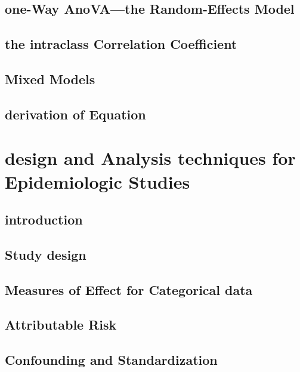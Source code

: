 \documentclass[12pt,]{article}
\theoremstyle{definition}
\theoremstyle{definition}
\theoremstyle{definition}
\theoremstyle{remark}
\begin{document}
\subsection{one-Way AnoVA---the Random-Effects
Model}\label{one-way-anovathe-random-effects-model}

\subsection{the intraclass Correlation
Coefficient}\label{the-intraclass-correlation-coefficient}

\subsection{Mixed Models}\label{mixed-models}

\subsection{derivation of Equation}\label{derivation-of-equation}

\section{design and Analysis techniques for Epidemiologic
Studies}\label{design-and-analysis-techniques-for-epidemiologic-studies}

\subsection{introduction}\label{introduction-9}

\subsection{Study design}\label{study-design}

\subsection{Measures of Effect for Categorical
data}\label{measures-of-effect-for-categorical-data}

\subsection{Attributable Risk}\label{attributable-risk}

\subsection{Confounding and
Standardization}\label{confounding-and-standardization}
\end{document}
